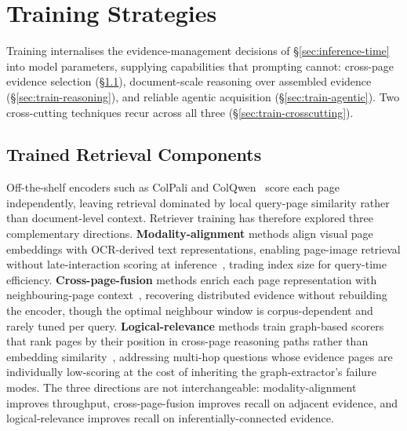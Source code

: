 \documentclass[11pt]{article}
\begin{document}
\section{Training Strategies}
\label{sec:training}
Training internalises the evidence-management decisions of \S\ref{sec:inference-time} into model parameters, supplying capabilities that prompting cannot: cross-page evidence selection (\S\ref{sec:train-retrieval}), document-scale reasoning over assembled evidence (\S\ref{sec:train-reasoning}), and reliable agentic acquisition (\S\ref{sec:train-agentic}). Two cross-cutting techniques recur across all three (\S\ref{sec:train-crosscutting}).

\subsection{Trained Retrieval Components}
\label{sec:train-retrieval}
Off-the-shelf encoders such as ColPali and ColQwen~\cite{Faysse2024-wq} score each page independently, leaving retrieval dominated by local query-page similarity rather than document-level context. Retriever training has therefore explored three complementary directions. \textbf{Modality-alignment} methods align visual page embeddings with OCR-derived text representations, enabling page-image retrieval without late-interaction scoring at inference~\cite{tanaka2025vdocrag}, trading index size for query-time efficiency. \textbf{Cross-page-fusion} methods enrich each page representation with neighbouring-page context~\cite{qian2026accurate}, recovering distributed evidence without rebuilding the encoder, though the optimal neighbour window is corpus-dependent and rarely tuned per query. \textbf{Logical-relevance} methods train graph-based scorers that rank pages by their position in cross-page reasoning paths rather than embedding similarity~\cite{wu2025molorag}, addressing multi-hop questions whose evidence pages are individually low-scoring at the cost of inheriting the graph-extractor's failure modes. The three directions are not interchangeable: modality-alignment improves throughput, cross-page-fusion improves recall on adjacent evidence, and logical-relevance improves recall on inferentially-connected evidence.
\end{document}
